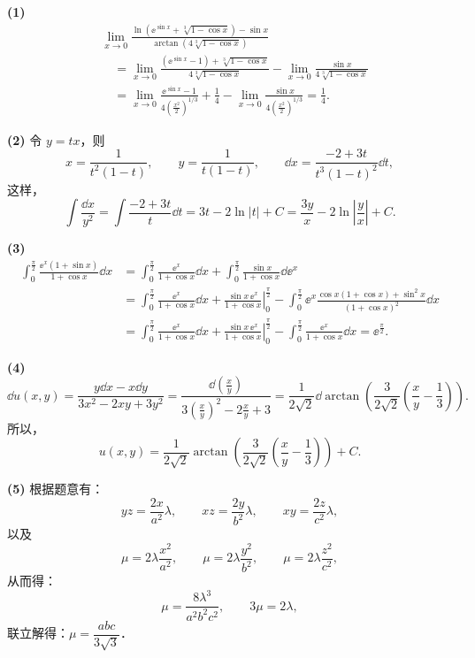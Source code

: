\begin{solution}
\textbf{(1)}
\begin{align*}
&\lim_{x\to0}\frac{\ln(\ee^{\sin x}+\sqrt[3]{1-\cos x})-\sin x}{\arctan(4\sqrt[3]{1-\cos x})}\\
&\quad=\lim_{x\to0}\frac{(\ee^{\sin x}-1)+\sqrt[3]{1-\cos x}}{4\sqrt[3]{1-\cos x}}
-\lim_{x\to0}\frac{\sin x}{4\sqrt[3]{1-\cos x}}\\
&\quad=\lim_{x\to0}\frac{\ee^{\sin x}-1}{4\left(\frac{x^2}{2}\right)^{1/3}}+\frac{1}{4}
-\lim_{x\to0}\frac{\sin x}{4\left(\frac{x^2}{2}\right)^{1/3}}=\frac{1}{4}.
\end{align*}

\textbf{(2)} 令 $y=tx$，则
\[
x=\frac{1}{t^2(1-t)},\qquad y=\frac{1}{t(1-t)},\qquad
\dd x=\frac{-2+3t}{t^3(1-t)^2}\dd t,
\]
这样，
\[
\int\frac{\dd x}{y^2}=\int\frac{-2+3t}{t}\dd t=3t-2\ln|t|+C
=\frac{3y}{x}-2\ln\left|\frac{y}{x}\right|+C.
\]

\textbf{(3)}
\begin{align*}
\int_0^{\frac{\pi}{2}}\frac{\ee^x(1+\sin x)}{1+\cos x}\dd x
&=\int_0^{\frac{\pi}{2}}\frac{\ee^x}{1+\cos x}\dd x+\int_0^{\frac{\pi}{2}}\frac{\sin x}{1+\cos x}\dd\ee^x\\
&=\int_0^{\frac{\pi}{2}}\frac{\ee^x}{1+\cos x}\dd x
+\left.\frac{\sin x\,\ee^x}{1+\cos x}\right|_0^{\frac{\pi}{2}}
-\int_0^{\frac{\pi}{2}}\ee^x\frac{\cos x(1+\cos x)+\sin^2x}{(1+\cos x)^2}\dd x\\
&=\int_0^{\frac{\pi}{2}}\frac{\ee^x}{1+\cos x}\dd x
+\left.\frac{\sin x\,\ee^x}{1+\cos x}\right|_0^{\frac{\pi}{2}}
-\int_0^{\frac{\pi}{2}}\frac{\ee^x}{1+\cos x}\dd x=\ee^{\frac{\pi}{2}}.
\end{align*}

\textbf{(4)}
\[
\dd u(x,y)=\frac{y\dd x-x\dd y}{3x^2-2xy+3y^2}
=\frac{\dd\left(\frac{x}{y}\right)}{3\left(\frac{x}{y}\right)^2-2\frac{x}{y}+3}
=\frac{1}{2\sqrt2}\dd\arctan\left(\frac{3}{2\sqrt2}\left(\frac{x}{y}-\frac{1}{3}\right)\right).
\]
所以，
\[
u(x,y)=\frac{1}{2\sqrt2}\arctan\left(\frac{3}{2\sqrt2}\left(\frac{x}{y}-\frac{1}{3}\right)\right)+C.
\]

\textbf{(5)} 根据题意有：
\[
yz=\frac{2x}{a^2}\lambda,\qquad xz=\frac{2y}{b^2}\lambda,\qquad xy=\frac{2z}{c^2}\lambda,
\]
以及
\[
\mu=2\lambda\frac{x^2}{a^2},\qquad \mu=2\lambda\frac{y^2}{b^2},\qquad \mu=2\lambda\frac{z^2}{c^2},
\]
从而得：
\[
\mu=\frac{8\lambda^3}{a^2b^2c^2},\qquad 3\mu=2\lambda,
\]
联立解得：$\mu=\dfrac{abc}{3\sqrt3}$．
\end{solution}

